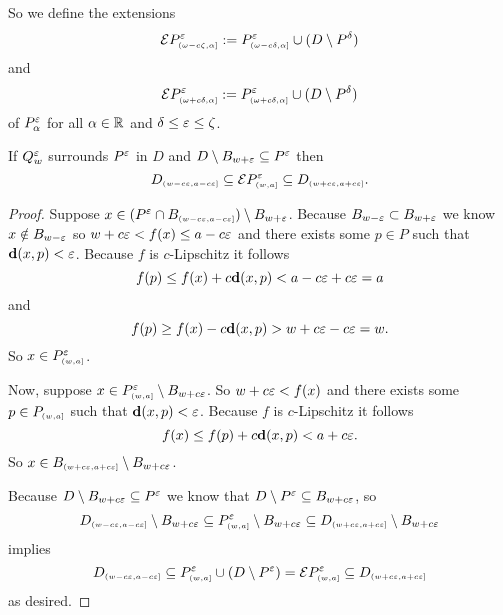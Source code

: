 So we define the extensions
\[\ext{P^\e\subi{\omega-c\zeta, \alpha}} := P^\e\subi{\omega-c\delta, \alpha}\cup (D\setminus P^\of)\]
and
\[\ext{P^\e\subi{\omega+c\delta, \alpha}} := P^\e\subi{\omega+c\delta, \alpha}\cup (D\setminus P^\of)\]
of $P^\e_\alpha$ for all $\alpha\in\R$ and $\delta\leq\e\leq\zeta$.

\begin{lemma}\label{lem:p_interleave}
 If $Q_w^\e$ surrounds $P^\e$ in $D$ and $D\setminus B_{w + \e}\subseteq P^\e$ then
 \[ D\subi{w-c\e, a-c\e} \subseteq \ext{P\subi{w, a}^\e}\subseteq D\subi{w+c\e,a+c\e}.\]
\end{lemma}
\begin{proof}
  Suppose $x\in (P^\e\cap B\subi{w-c\e, a-c\e})\setminus B_{w+\e}$.
  Because $B_{w-\e}\subset B_{w+\e}$ we know $x\notin B_{w-\e}$ so $w+c\e < f(x)\leq a-c\e$ and there exists some $p\in P$ such that $\dist(x, p) < \e$.
  Because $f$ is $c$-Lipschitz it follows
  \[ f(p)\leq f(x) + c\dist(x, p) < a - c\e + c\e = a\]
  and
  \[ f(p)\geq f(x) - c\dist(x, p) > w+c\e-c\e = w.\]
  So $x\in P\subi{w,a}^\e$.

  Now, suppose $x\in P\subi{w,a}^\e\setminus B_{w+c\e}$.
  So $w+c\e < f(x)$ and there exists some $p\in P\subi{w,a}$ such that $\dist(x,p) < \e$.
  Because $f$ is $c$-Lipschitz it follows
  \[ f(x) \leq f(p) + c\dist(x,p) < a + c\e.\]
  So $x\in B\subi{w+c\e, a+c\e}\setminus B_{w+c\e}$.

  Because $D\setminus B_{w+c\e}\subseteq P^\e$ we know that $D\setminus P^\e \subseteq B_{w+c\e}$, so
  \[D\subi{w-c\e, a-c\e}\setminus B_{w+c\e} \subseteq P\subi{w,a}^\e\setminus B_{w+c\e}\subseteq D\subi{w+c\e, a+c\e}\setminus B_{w+c\e}\]
  implies
  \[ D\subi{w-c\e, a-c\e}\subseteq P\subi{w,a}^\e\cup (D\setminus P^\e) = \ext{P\subi{w,a}^\e} \subseteq D\subi{w+c\e, a+c\e} \]
  as desired.
\end{proof}
